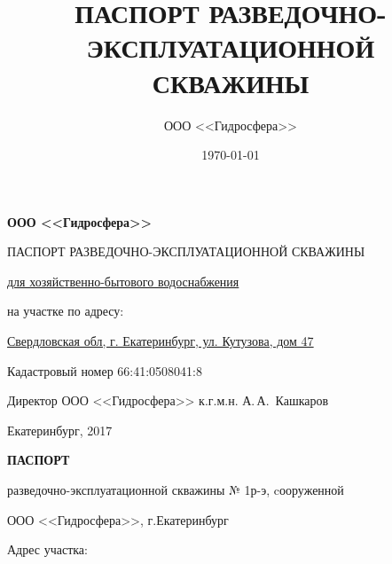 \documentclass[a4paper,12pt]{article} %
\author{ООО <<Гидросфера>>}\label{company}
\title{ПАСПОРТ РАЗВЕДОЧНО-ЭКСПЛУАТАЦИОННОЙ СКВАЖИНЫ}
\date{\today}
\newcommand{\txtExecutor}{ООО <<Гидросфера>>}			%
\newcommand{\txtYear}{2017}			%
\newcommand{\txtNumber}{№ 1р-э}  					%
\newcommand{\txtAddress}{Свердловская обл, г. Екатеринбург, ул. Кутузова, дом 47}
\newcommand{\txtCadaster}{66:41:0508041:8} 			%
\begin{document}


\begin{titlepage}
	\begin{center}
		\textbf{\txtExecutor}
		\vspace{5.5cm}
		
		{\LARGE ПАСПОРТ РАЗВЕДОЧНО-ЭКСПЛУАТАЦИОННОЙ СКВАЖИНЫ}
		\vspace{0.25cm}
		
		\underline{для хозяйственно-бытового водоснабжения}
		
		\bigskip
		
		на участке по адресу:
				
		\underline{\txtAddress}
		
		\bigskip
		Кадастровый номер \txtCadaster
		
		\vfill
	
		\bigskip
		
	\end{center}

	\vfill
	
	\newlength{\ML}
	\hfill
	\begin{minipage}{1.0\textwidth}
		Директор ООО <<Гидросфера>> к.г.м.н.
		\underline{\hspace{\ML}} А.\,А.~Кашкаров\\
	\end{minipage}%
	
	\bigskip
	
	\vfill
	\begin{center}
		Екатеринбург, \txtYear
	\end{center}			

	\end{titlepage}


	\begin{center}
		\textbf{ПАСПОРТ}

		разведочно-эксплуатационной скважины \txtNumber, cооруженной 

		\txtExecutor, г.Екатеринбург

	\end{center}


	\bigskip
	
	Адрес участка: 
\end{document}
